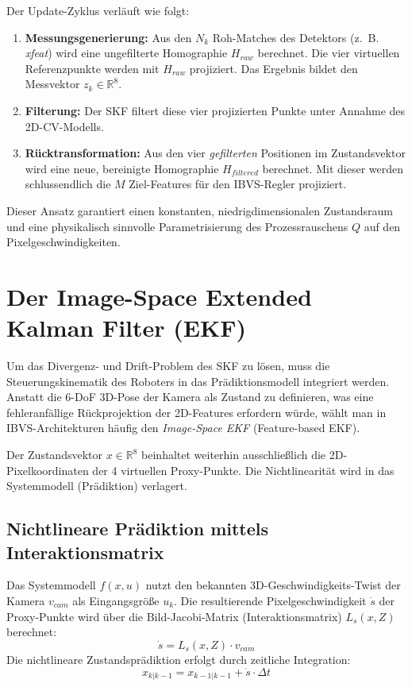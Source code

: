\documentclass{article}
\begin{document}
Der Update-Zyklus verläuft wie folgt:
\begin{enumerate}
    \item \textbf{Messungsgenerierung:} Aus den $N_k$ Roh-Matches des Detektors (z.~B. \textit{xfeat}) wird eine ungefilterte Homographie $H_{raw}$ berechnet. Die vier virtuellen Referenzpunkte werden mit $H_{raw}$ projiziert. Das Ergebnis bildet den Messvektor $z_k \in \mathbb{R}^8$.
    \item \textbf{Filterung:} Der SKF filtert diese vier projizierten Punkte unter Annahme des 2D-CV-Modells.
    \item \textbf{Rücktransformation:} Aus den vier \textit{gefilterten} Positionen im Zustandsvektor wird eine neue, bereinigte Homographie $H_{filtered}$ berechnet. Mit dieser werden schlussendlich die $M$ Ziel-Features für den IBVS-Regler projiziert.
\end{enumerate}
Dieser Ansatz garantiert einen konstanten, niedrigdimensionalen Zustandsraum und eine physikalisch sinnvolle Parametrisierung des Prozessrauschens $Q$ auf den Pixelgeschwindigkeiten.





\section{Der Image-Space Extended Kalman Filter (EKF)}
\label{sec:image_space_ekf}

Um das Divergenz- und Drift-Problem des SKF zu lösen, muss die Steuerungskinematik des Roboters in das Prädiktionsmodell integriert werden. Anstatt die 6-DoF 3D-Pose der Kamera als Zustand zu definieren, was eine fehleranfällige Rückprojektion der 2D-Features erfordern würde, wählt man in IBVS-Architekturen häufig den \textit{Image-Space EKF} (Feature-based EKF).

Der Zustandsvektor $x \in \mathbb{R}^8$ beinhaltet weiterhin ausschließlich die 2D-Pixelkoordinaten der 4 virtuellen Proxy-Punkte. Die Nichtlinearität wird in das Systemmodell (Prädiktion) verlagert.




\subsection{Nichtlineare Prädiktion mittels Interaktionsmatrix}
Das Systemmodell $f(x, u)$ nutzt den bekannten 3D-Geschwindigkeits-Twist der Kamera $v_{cam}$ als Eingangsgröße $u_k$. Die resultierende Pixelgeschwindigkeit $\dot{s}$ der Proxy-Punkte wird über die Bild-Jacobi-Matrix (Interaktionsmatrix) $L_s(x, Z)$ berechnet:
\begin{equation}
    \dot{s} = L_s(x, Z) \cdot v_{cam}
\end{equation}
Die nichtlineare Zustandsprädiktion erfolgt durch zeitliche Integration:
\begin{equation}
    x_{k|k-1} = x_{k-1|k-1} + \dot{s} \cdot \Delta t
\end{equation}
\end{document}

